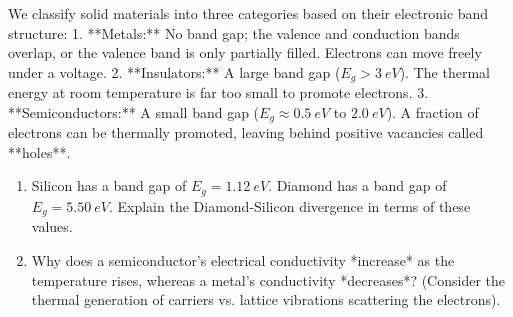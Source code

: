 \documentclass[12pt, a4paper]{book}
\begin{document}
\begin{explobox}
We classify solid materials into three categories based on their electronic band structure:
1. **Metals:** No band gap; the valence and conduction bands overlap, or the valence band is only partially filled. Electrons can move freely under a voltage.
2. **Insulators:** A large band gap ($E_g > \SI{3}{eV}$). The thermal energy at room temperature is far too small to promote electrons.
3. **Semiconductors:** A small band gap ($E_g \approx \SI{0.5}{eV}$ to $\SI{2.0}{eV}$). A fraction of electrons can be thermally promoted, leaving behind positive vacancies called **holes**.

\begin{center}
\end{center}
\begin{enumerate}[label=(\alph*), leftmargin=*]
  \item Silicon has a band gap of $E_g = \SI{1.12}{eV}$. Diamond has a band gap of $E_g = \SI{5.50}{eV}$.
        Explain the Diamond-Silicon divergence in terms of these values.
  \item Why does a semiconductor's electrical conductivity *increase* as the temperature rises, whereas a metal's conductivity *decreases*? (Consider the thermal generation of carriers vs. lattice vibrations scattering the electrons).
\end{enumerate}
\end{explobox}
\end{document}
